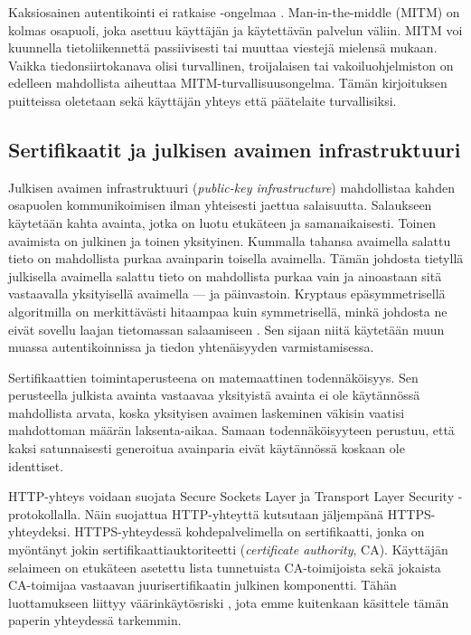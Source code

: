\documentclass{tktltiki}
\begin{document}
Kaksiosainen autentikointi ei ratkaise \cite{man-in-the-middle}-ongelmaa \cite{schneier_2factor_2005}. 
Man-in-the-middle (MITM) on kolmas osapuoli, joka asettuu käyttäjän ja käytettävän palvelun väliin. MITM voi kuunnella tietoliikennettä passiivisesti tai muuttaa viestejä mielensä mukaan. Vaikka tiedonsiirtokanava olisi turvallinen, troijalaisen tai vakoiluohjelmiston on edelleen mahdollista aiheuttaa MITM-turvallisuusongelma. Tämän kirjoituksen puitteissa oletetaan sekä käyttäjän yhteys että päätelaite turvallisiksi.


\subsection{Sertifikaatit ja julkisen avaimen infrastruktuuri}

Julkisen avaimen infrastruktuuri (\emph{public-key infrastructure}) mahdollistaa kahden osapuolen kommunikoimisen ilman yhteisesti jaettua salaisuutta. 
Salaukseen käytetään kahta avainta, jotka on luotu etukäteen ja samanaikaisesti. Toinen avaimista on julkinen ja toinen yksityinen. Kummalla tahansa avaimella salattu tieto on mahdollista purkaa avainparin toisella avaimella. Tämän johdosta tietyllä julkisella avaimella salattu tieto on mahdollista purkaa vain ja ainoastaan sitä vastaavalla yksityisellä avaimella --- ja päinvastoin. Kryptaus epäsymmetrisellä algoritmilla on merkittävästi hitaampaa kuin symmetrisellä, minkä johdosta ne eivät sovellu laajan tietomassan salaamiseen \cite{nist_pki_intro, NIST_SP800-63}. Sen sijaan niitä käytetään muun muassa autentikoinnissa ja tiedon yhtenäisyyden varmistamisessa.

Sertifikaattien toimintaperusteena on matemaattinen todennäköisyys. Sen perusteella julkista avainta vastaavaa yksityistä avainta ei ole käytännössä mahdollista arvata, koska yksityisen avaimen laskeminen väkisin vaatisi mahdottoman määrän laksenta-aikaa. Samaan todennäköisyyteen perustuu, että kaksi satunnaisesti generoitua avainparia eivät käytännössä koskaan ole identtiset.

HTTP-yhteys voidaan suojata Secure Sockets Layer ja Transport Layer Security -protokollalla. Näin suojattua HTTP-yhteyttä kutsutaan jäljempänä HTTPS-yhteydeksi. HTTPS-yhteydessä kohdepalvelimella on sertifikaatti, jonka on myöntänyt jokin sertifikaattiauktoriteetti (\emph{certificate authority}, CA). Käyttäjän selaimeen on etukäteen asetettu lista tunnetuista CA-toimijoista sekä jokaista CA-toimijaa vastaavan juurisertifikaatin julkinen komponentti. Tähän luottamukseen liittyy väärinkäytösriski \cite{certified_lies, eff_ssliverse}, jota emme kuitenkaan käsittele tämän paperin yhteydessä tarkemmin.
\end{document}
